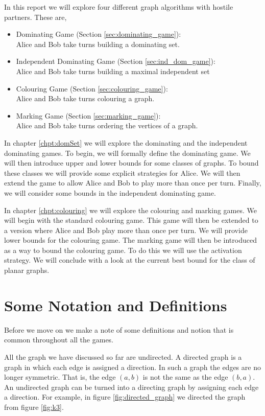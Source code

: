 In this report 
we will explore four different graph algorithms with hostile partners. These are,
\begin{itemize}
    \item Dominating Game (Section \ref{sec:dominating_game}): \\
        Alice and Bob take turns building a dominating set.
    \item Independent Dominating Game (Section \ref{sec:ind_dom_game}): \\
        Alice and Bob take turns building a maximal independent set    
    \item Colouring Game (Section \ref{sec:colouring_game}): \\
        Alice and Bob take turns colouring a graph.
    \item Marking Game (Section \ref{sec:marking_game}): \\
        Alice and Bob take turns ordering the vertices of a graph.
\end{itemize}

In chapter \ref{chpt:domSet} we will explore the dominating and the independent dominating games. To begin, we  will formally define the dominating game. We will then introduce upper and lower bounds for some classes of graphs. To bound these classes we will provide some explicit strategies for Alice. We will then extend the game to allow Alice and Bob to play more than once per turn. Finally, we will consider some bounds in the independent dominating game.

In chapter \ref{chpt:colouring} we will explore the colouring and marking games. We will begin with the standard colouring game. This game will then be extended to a version where Alice and Bob play more than once per turn. We will provide lower bounds for the colouring game. The marking game will then be introduced as a way to bound the colouring game. To do this we will use the activation strategy. We will conclude with a look at the current best bound for the class of planar graphs.
    

\section{Some Notation and Definitions}
    
Before we move on we make a note of some definitions and notion that is common throughout all the games.
    
All the graph we have discussed so far are undirected. A directed graph is a graph in which each edge is assigned a direction. In such a graph the edges are no longer symmetric. That is, the edge $(a,b)$ is not the same as the edge $(b,a)$. An undirected graph can be turned into a directing graph by assigning each edge a direction. For example, in figure \ref{fig:directed_graph} we directed the graph from figure \ref{fig:k3}. 

